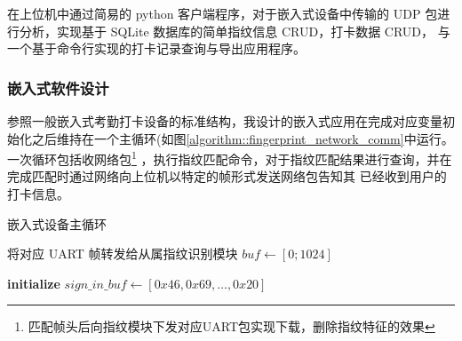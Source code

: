     在上位机中通过简易的 python 客户端程序，对于嵌入式设备中传输的 UDP 包进行分析，实现基于 SQLite 数据库的简单指纹信息 CRUD，打卡数据 CRUD，
    与一个基于命令行实现的打卡记录查询与导出应用程序。

    \subsubsection{嵌入式软件设计}

    参照一般嵌入式考勤打卡设备的标准结构，我设计的嵌入式应用在完成对应变量初始化之后维持在一个主循环(如图\ref{algorithm::fingerprint_network_comm}中运行。
    一次循环包括收网络包\footnote{匹配帧头后向指纹模块下发对应UART包实现下载，删除指纹特征的效果}
    ，执行指纹匹配命令，对于指纹匹配结果进行查询，并在完成匹配时通过网络向上位机以特定的帧形式发送网络包告知其
    已经收到用户的打卡信息。

    \begin{algorithm}[htb]
        \caption{嵌入式设备主循环}
        \label{algorithm::fingerprint_network_comm}
        \begin{algorithmic}[1]
         
             
                    \State 将对应 UART 帧转发给从属指纹识别模块
                \EndIf
                \State $buf \gets [0; 1024]$ 
                \State {} 
            \EndIf
        
            \State {} 

            \State {} 
            \State {} 
            
            \State {} 
        
              
                \State {} 
                
                    \State \textbf{initialize} $sign\_in\_buf \gets [0x46, 0x69, \ldots, 0x20]$ 
                    \State {} 
                    \State {}
                    \State {} 
                \EndIf
                \State {}
            \EndIf
        \EndWhile
        \end{algorithmic}
        \end{algorithm}
        

